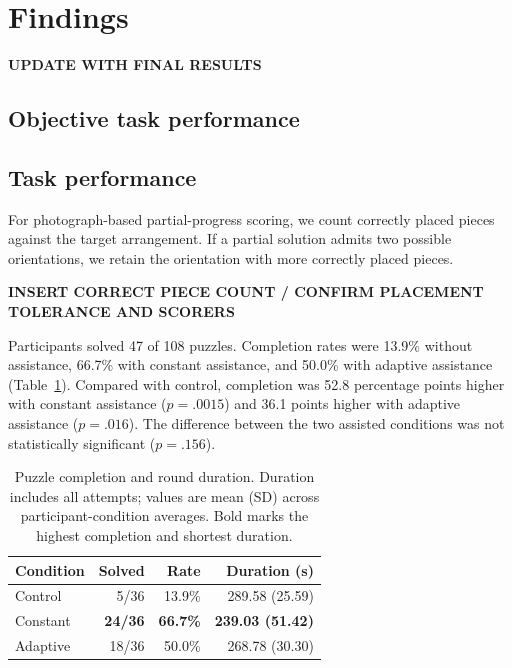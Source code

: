 \documentclass[sigconf,anonymous,balance=false]{aamas}
\providecommand{\DIFadd}[1]{{\protect\color{blue} \sf #1}} %
\providecommand{\DIFdel}[1]{{\protect\color{red} \scriptsize #1}} %
\providecommand{\DIFaddbegin}{} %
\providecommand{\DIFaddend}{} %
\providecommand{\DIFdelbegin}{} %
\providecommand{\DIFdelend}{} %
\begin{document}
\DIFaddbegin \section{\DIFadd{Findings}}

\DIFaddend \textbf{UPDATE WITH FINAL RESULTS}

\DIFdelbegin \subsection{\DIFdel{Objective task performance}}
\addtocounter{subsection}{-1}%
\DIFdelend \DIFaddbegin \subsection{\DIFadd{Task performance}}
\DIFaddend 

\DIFdelbegin \DIFdel{For photograph-based partial-progress scoring, we count correctly placed pieces against the target arrangement. If a partial solution admits two possible orientations, we retain the orientation with more correctly placed pieces.
}%

\DIFdelend \textbf{INSERT CORRECT PIECE COUNT / CONFIRM PLACEMENT TOLERANCE AND SCORERS}

Participants solved 47 of 108 puzzles. Completion rates were 13.9\% without assistance, 66.7\% with constant assistance, and 50.0\% with adaptive assistance (Table~\ref{tab:performance}). Compared with control, completion was 52.8 percentage points higher with constant assistance ($p=.0015$) and 36.1 points higher with adaptive assistance ($p=.016$). The difference between the two assisted conditions was not statistically significant ($p=.156$).

\begin{table}[t]
\centering
\caption{Puzzle completion and round duration. Duration includes all attempts; values are mean (SD) across participant-condition averages. Bold marks the highest completion and shortest duration.}
\label{tab:performance}
\begin{tabular}{lrrr}
\toprule
Condition & Solved & Rate & Duration (s) \\
\midrule
Control & 5/36 & 13.9\% & 289.58 (25.59) \\
Constant & \textbf{24/36} & \textbf{66.7\%} & \textbf{239.03 (51.42)} \\
Adaptive & 18/36 & 50.0\% & 268.78 (30.30) \\
\bottomrule
\end{tabular}
\end{table}
\end{document}
